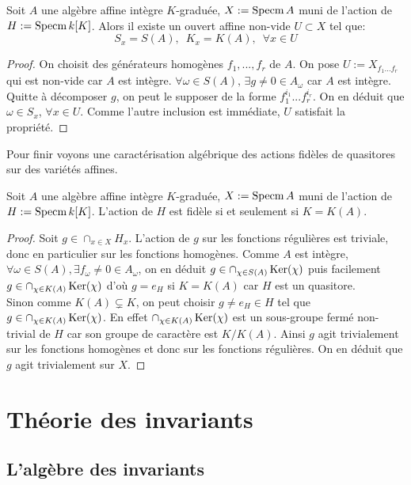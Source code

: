 \begin{prop}
Soit $A$ une algèbre affine intègre $K$-graduée, $X:=\operatorname{Specm} A$ muni de l'action de $H:=\operatorname{Specm} k[K]$. Alors il existe un ouvert affine non-vide $U\subset X$ tel que:
$$S_x=S(A),\,\,\, K_x=K(A),\,\,\, \forall x\in U$$
\end{prop}
\begin{proof}
On choisit des générateurs homogènes $f_1,...,f_r$ de $A$. On pose $U:=X_{f_1...f_r}$ qui est non-vide car $A$ est intègre. $\forall \omega \in S(A),\, \exists g\neq0 \in A_\omega$ car $A$ est intègre. Quitte à décomposer $g$,  on peut le supposer de la forme $f_1^{i_1}...f_r^{i_r}$. On en déduit que $\omega \in S_x$, $\forall x\in U$. Comme l'autre inclusion est immédiate, $U$ satisfait la propriété.
\end{proof}


Pour finir voyons une caractérisation algébrique des actions fidèles de quasitores sur des variétés affines.

\begin{prop}
Soit $A$ une algèbre affine intègre $K$-graduée, $X:=\operatorname{Specm} A$ muni de l'action de $H:=\operatorname{Specm} k[K]$. L'action de $H$ est fidèle si et seulement si $K=K(A)$.
\end{prop}
\begin{proof}
Soit $g\in \cap_{x\in X}H_x$. L'action de $g$ sur les fonctions régulières est triviale, donc en particulier sur les fonctions homogènes. Comme $A$ est intègre, $\forall \omega \in S(A), \exists f_\omega\neq 0\in A_\omega$, on en déduit $g\in \cap_{\chi \in S(A)} \operatorname{Ker}(\chi)$ puis facilement $g\in \cap_{\chi \in K(A)} \operatorname{Ker}(\chi)$ d'où $g=e_H$ si $K=K(A)$ car $H$ est un quasitore.\\
Sinon comme $K(A)\subsetneq K$, on peut choisir $g\neq e_H\in H$ tel que $g\in\cap_{\chi \in K(A)} \operatorname{Ker}(\chi)$. En effet $\cap_{\chi \in K(A)} \operatorname{Ker}(\chi)$ est un sous-groupe fermé non-trivial de $H$ car son groupe de caractère est $K/K(A)$. Ainsi $g$ agit trivialement sur les fonctions homogènes et donc sur les fonctions régulières. On en déduit que $g$ agit trivialement sur $X$.
\end{proof}

\section{Théorie des invariants}
\subsection{L'algèbre des invariants}

